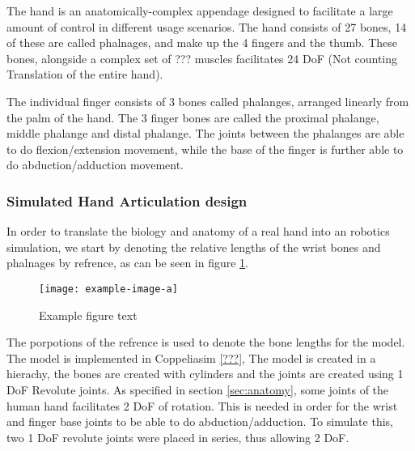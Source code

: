 \documentclass[../main.tex]{subfiles}
\begin{document}
The hand is an anatomically-complex appendage designed to facilitate a large amount of control in different usage scenarios.
The hand consists of 27 bones, 14 of these are called phalnages, and make up the 4 fingers and the thumb. These bones, alongside a complex set of ??? muscles facilitates 24 DoF (Not counting Translation of the entire hand).

The individual finger consists of 3 bones called \gls{phalanges}, arranged linearly from the palm of the hand.
The 3 finger bones are called the proximal phalange, middle phalange and distal phalange.
The joints between the phalanges are able to do \gls{flexion/extension} movement, while the base of the finger is further able to do \gls{abduction/adduction} movement.


\subsubsection{Simulated Hand Articulation design}


In order to translate the biology and anatomy of a real hand into an robotics simulation, we start by denoting the relative lengths of the wrist bones and phalnages by refrence, as can be seen in figure \ref{fig:handref}.

\begin{figure}[h]
\begin{center}
\texttt{[image: example-image-a]}
\caption{Example figure text}
\label{fig:handref}
\end{center}
\end{figure}


The porpotions of the refrence is used to denote the bone lengths for the model.
The model is implemented in Coppeliasim \ref{???}, The model is created in a hierachy, the bones are created with cylinders and the joints are created using 1 DoF Revolute joints.
As specified in section \ref{sec:anatomy}, some joints of the human hand facilitates 2 DoF of rotation.
This is needed in order for the wrist and finger base joints to be able to do \gls{abduction/adduction}.
To simulate this, two 1 DoF revolute joints were placed in series, thus allowing 2 DoF.
\end{document}
